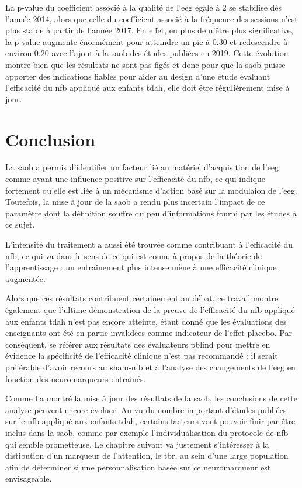 La p-value du coefficient associé à la qualité de l'\gls{eeg} égale à 2 se stabilise dès l'année 2014, alors que celle du coefficient associé à la fréquence des sessions 
n'est plus stable à partir de l'année 2017. En effet, en plus de n'être plus significative, la p-value augmente énormément pour atteindre un pic à 0.30 et redescendre à environ 0.20
avec l'ajout à la \gls{saob} des études publiées en 2019. Cette évolution montre bien que les résultats ne sont pas figés et donc pour que la \gls{saob} puisse apporter des indications
fiables pour aider au design d'une étude évaluant l'efficacité du \gls{nfb} appliqué aux enfants \gls{tdah}, elle doit être régulièrement mise à jour. 

\section{Conclusion}

La \gls{saob} a permis d'identifier un facteur lié au matériel d'acquisition de l'\gls{eeg} comme ayant une influence positive sur l'efficacité du \gls{nfb}, 
ce qui indique fortement qu'elle est liée à un mécanisme d'action basé sur la modulaion de l'\gls{eeg}. Toutefois, la mise à jour de la \gls{saob} a rendu
plus incertain l'impact de ce paramètre dont la définition souffre du peu d'informations fourni par les études à ce sujet. 

L'intensité du traitement a aussi été trouvée comme contribuant à l'efficacité du \gls{nfb}, ce qui va dans le sens de ce qui est connu à propos de 
la théorie de l'apprentissage \citep{Mowrer1960} : un entrainement plus intense mène à une efficacité clinique augmentée. 

Alors que ces résultats contribuent certainement au débat, ce travail montre également que l'ultime démonstration de la preuve de l'efficacité du \gls{nfb}
appliqué aux enfants \gls{tdah} n'est pas encore atteinte, étant donné que les évaluations des enseignants ont été en partie invalidées comme indicateur de 
l'effet placebo. Par conséquent, se référer aux résultats des évaluateurs \gls{pblind} pour mettre en évidence la spécificité de l'efficacité clinique n'est pas 
recommandé : il serait préférable d'avoir recours au sham-\gls{nfb} et à l'analyse des changements de l'\gls{eeg} en fonction des neuromarqueurs entrainés.

Comme l'a montré la mise à jour des résultats de la \gls{saob}, les conclusions de cette analyse peuvent encore évoluer. Au vu du nombre important 
d'études publiées sur le \gls{nfb} appliqué aux enfants \gls{tdah}, certains facteurs vont pouvoir finir par être inclus dans la \gls{saob}, comme par exemple 
l'individualisation du protocole de \gls{nfb} qui semble prometteuse. Le chapitre suivant va justement s'intéresser à la distibution d'un marqueur de l'attention, 
le \gls{tbr}, au sein d'une large population afin de déterminer si une personnalisation basée sur ce neuromarqueur est envisageable.




 